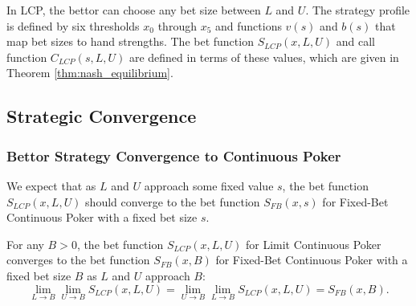 \documentclass[../../main/main.tex]{subfiles}
\begin{document}
In LCP, the bettor can choose any bet size between $L$ and $U$. The strategy profile is defined by six thresholds $x_0$ through $x_5$ and functions $v(s)$ and $b(s)$ that map bet sizes to hand strengths. The bet function $S_{LCP}(x, L, U)$ and call function $C_{LCP}(s, L, U)$ are defined in terms of these values, which are given in Theorem \ref{thm:nash_equilibrium}.

\subsection{Strategic Convergence}
\label{sec:strategic_convergence}

\subsubsection{Bettor Strategy Convergence to Continuous Poker}
We expect that as $L$ and $U$ approach some fixed value $s$, the bet function $S_{LCP}(x, L, U)$ should converge to the bet function $S_{FB}(x, s)$ for Fixed-Bet Continuous Poker with a fixed bet size $s$. 

\begin{theorem}
	 For any $B > 0$, the bet function $S_{LCP}(x, L, U)$ for Limit Continuous Poker converges to the bet function $S_{FB}(x, B)$ for Fixed-Bet Continuous Poker with a fixed bet size $B$ as $L$ and $U$ approach $B$:
\[
\lim_{L \to B} \lim_{U \to B} S_{LCP}(x, L, U) = \lim_{U \to B} \lim_{L \to B} S_{LCP}(x, L, U) = S_{FB}(x, B).
\]
\end{theorem}
\end{document}
